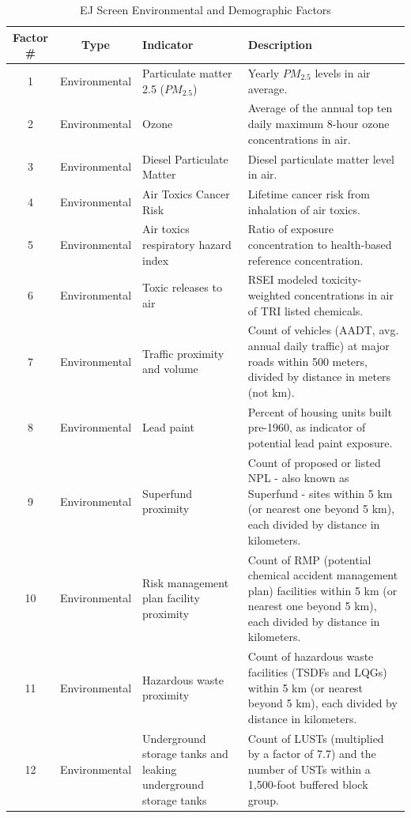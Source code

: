 \documentclass[letterpaper, 10 pt, conference]{ieeeconf}  %
\begin{document}
\begin{table}[h]
        \begin{center}
        \caption{EJ Screen Environmental and Demographic Factors\cite{EPA_2023b}\cite{EPA_2023d} }
    \label{fig:enter-label}
\begin{tabular}{|c|c|p{5cm}|p{5cm}|}
\hline 
 Factor \# & Type & Indicator & Description \\
\hline 
 1 & Environmental & Particulate matter 2.5 ($\displaystyle PM_{2.5}$) & Yearly $\displaystyle PM_{2.5}$ levels in air average. \\
\hline 
 2 & Environmental & Ozone & Average of the annual top ten daily maximum 8-hour ozone concentrations in air. \\
\hline 
 3 & Environmental & Diesel Particulate Matter & Diesel particulate matter level in air. \\
\hline 
 4 & Environmental & Air Toxics Cancer Risk & Lifetime cancer risk from inhalation of air toxics. \\
\hline 
 5 & Environmental & Air toxics respiratory hazard index & Ratio of exposure concentration to health-based reference concentration. \\
\hline 
 6 & Environmental & Toxic releases to air & RSEI modeled toxicity-weighted concentrations in air of TRI listed chemicals. \\
\hline 
 7 & Environmental & Traffic proximity and volume & Count of vehicles (AADT, avg. annual daily traffic) at major roads within 500 meters, divided by distance in meters (not km). \\
\hline 
 8 & Environmental & Lead paint & Percent of housing units built pre-1960, as indicator of potential lead paint exposure. \\
\hline 
 9 & Environmental & Superfund proximity & Count of proposed or listed NPL - also known as Superfund - sites within 5 km (or nearest one beyond 5 km), each divided by distance in kilometers. \\
\hline 
 10 & Environmental & Risk management plan facility proximity & Count of RMP (potential chemical accident management plan) facilities within 5 km (or nearest one beyond 5 km), each divided by distance in kilometers. \\
\hline 
 11 & Environmental & Hazardous waste proximity & Count of hazardous waste facilities (TSDFs and LQGs) within 5 km (or nearest beyond 5 km), each divided by distance in kilometers. \\
\hline 
 12 & Environmental & Underground storage tanks and leaking underground storage tanks & Count of LUSTs (multiplied by a factor of 7.7) and the number of USTs within a 1,500-foot buffered block group. \\

\end{tabular}
\end{center}
\end{table}
\end{document}
